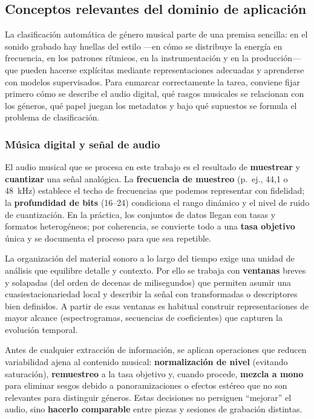 \documentclass[12pt,twoside]{article}
\begin{document}
\subsection{Conceptos relevantes del dominio de aplicación}

La clasificación automática de género musical parte de una premisa sencilla: en el sonido grabado hay huellas del estilo —en cómo se distribuye la energía en frecuencia, en los patrones rítmicos, en la instrumentación y en la producción— que pueden hacerse explícitas mediante representaciones adecuadas y aprenderse con modelos supervisados. Para enmarcar correctamente la tarea, conviene fijar primero cómo se describe el audio digital, qué rasgos musicales se relacionan con los géneros, qué papel juegan los metadatos y bajo qué supuestos se formula el problema de clasificación.

\subsubsection{Música digital y señal de audio}

El audio musical que se procesa en este trabajo es el resultado de \textbf{muestrear} y \textbf{cuantizar} una señal analógica. La \textbf{frecuencia de muestreo} (p.~ej., 44{,}1 o 48~kHz) establece el techo de frecuencias que podemos representar con fidelidad; la \textbf{profundidad de bits} (16--24) condiciona el rango dinámico y el nivel de ruido de cuantización. En la práctica, los conjuntos de datos llegan con tasas y formatos heterogéneos; por coherencia, se convierte todo a una \textbf{tasa objetivo} única y se documenta el proceso para que sea repetible.

La organización del material sonoro a lo largo del tiempo exige una unidad de análisis que equilibre detalle y contexto. Por ello se trabaja con \textbf{ventanas} breves y solapadas (del orden de decenas de milisegundos) que permiten asumir una cuasiestacionariedad local y describir la señal con transformadas o descriptores bien definidos. A partir de esas ventanas es habitual construir representaciones de mayor alcance (espectrogramas, secuencias de coeficientes) que capturen la evolución temporal.

Antes de cualquier extracción de información, se aplican operaciones que reducen variabilidad ajena al contenido musical: \textbf{normalización de nivel} (evitando saturación), \textbf{remuestreo} a la tasa objetivo y, cuando procede, \textbf{mezcla a mono} para eliminar sesgos debido a panoramizaciones o efectos estéreo que no son relevantes para distinguir géneros. Estas decisiones no persiguen ``mejorar'' el audio, sino \textbf{hacerlo comparable} entre piezas y sesiones de grabación distintas.
\end{document}
